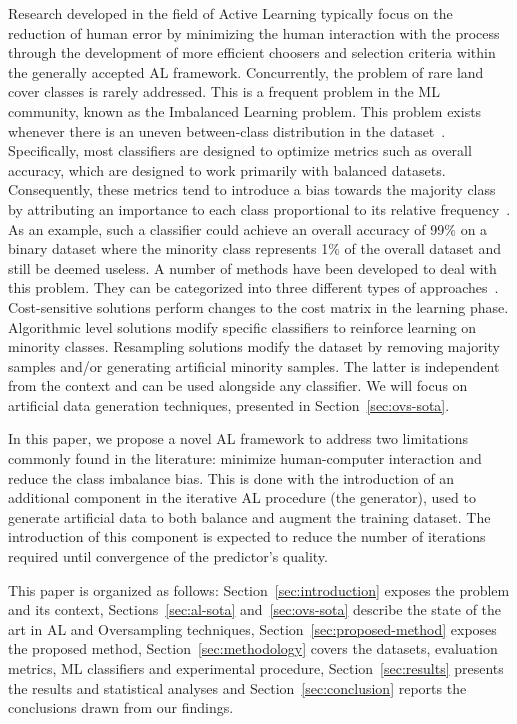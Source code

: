 \documentclass[parskip=full]{scrartcl}
\begin{document}
Research developed in the field of Active Learning typically focus on the reduction of human error
by minimizing the human interaction with the process through the development of more efficient
choosers and selection criteria within the generally accepted AL framework.  Concurrently, the
problem of rare land cover classes is rarely addressed. This is a frequent problem in the ML
community, known as the Imbalanced Learning problem.  This problem exists whenever there is an
uneven between-class distribution in the dataset~\cite{Chawla2004}. Specifically, most classifiers
are designed to optimize metrics such as overall accuracy, which are designed to work primarily with
balanced datasets. Consequently, these metrics tend to introduce a bias towards the majority class
by attributing an importance to each class proportional to its relative
frequency~\cite{Maxwell2018}. As an example, such a classifier could achieve an overall accuracy of
99\% on a binary dataset where the minority class represents 1\% of the overall dataset and still be
deemed useless. A number of methods have been developed to deal with this problem. They can be
categorized into three different types of approaches~\cite{Fernandez2013,Kaur2019}. Cost-sensitive
solutions perform changes to the cost matrix in the learning phase. Algorithmic level solutions
modify specific classifiers to reinforce learning on minority classes. Resampling solutions modify
the dataset by removing majority samples and/or generating artificial minority samples. The latter
is independent from the context and can be used alongside any classifier. We will focus on
artificial data generation techniques, presented in Section~\ref{sec:ovs-sota}.

In this paper, we propose a novel AL framework to address two limitations commonly found in the
literature: minimize human-computer interaction and reduce the class imbalance bias. This is done
with the introduction of an additional component in the iterative AL procedure (the generator), used
to generate artificial data to both balance and augment the training dataset. The introduction of
this component is expected to reduce the number of iterations required until convergence of the
predictor's quality.

This paper is organized as follows: Section~\ref{sec:introduction} exposes the problem and its
context, Sections~\ref{sec:al-sota} and~\ref{sec:ovs-sota} describe the state of the art in AL and
Oversampling techniques, Section~\ref{sec:proposed-method} exposes the proposed method,
Section~\ref{sec:methodology} covers the datasets, evaluation metrics, ML classifiers and
experimental procedure, Section~\ref{sec:results} presents the results and statistical analyses and
Section~\ref{sec:conclusion} reports the conclusions drawn from our findings.
\end{document}
